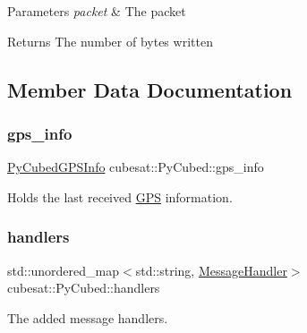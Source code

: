 \begin{DoxyParams}{Parameters}
{\em packet} & The packet \\
\hline
\end{DoxyParams}
\begin{DoxyReturn}{Returns}
The number of bytes written 
\end{DoxyReturn}


\subsection{Member Data Documentation}
\mbox{\label{classcubesat_1_1PyCubed_a0129f71b136ecc13fc378356431ccad0}} 
\subsubsection{\texorpdfstring{gps\+\_\+info}{gps\_info}}
{\footnotesize\ttfamily \hyperlink{structcubesat_1_1PyCubedGPSInfo}{Py\+Cubed\+G\+P\+S\+Info} cubesat\+::\+Py\+Cubed\+::gps\+\_\+info\hspace{0.3cm}{\ttfamily [private]}}



Holds the last received \hyperlink{classcubesat_1_1GPS}{G\+PS} information. 

\mbox{\label{classcubesat_1_1PyCubed_aacc466db4b35e383eedd385db64522a1}} 
\subsubsection{\texorpdfstring{handlers}{handlers}}
{\footnotesize\ttfamily std\+::unordered\+\_\+map$<$std\+::string, \hyperlink{structcubesat_1_1PyCubed_1_1MessageHandler}{Message\+Handler}$>$ cubesat\+::\+Py\+Cubed\+::handlers\hspace{0.3cm}{\ttfamily [private]}}



The added message handlers. 

\mbox{\label{classcubesat_1_1PyCubed_a8ecd72592ea8f3287a520e2ac834878c}} 

